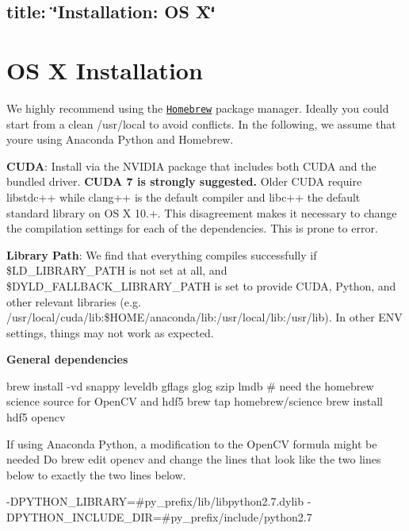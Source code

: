 

 \subsection*{title\+: \char`\"{}\+Installation\+: O\+S X\char`\"{} }

\section*{OS X Installation}

We highly recommend using the \href{http://brew.sh/}{\tt Homebrew} package manager. Ideally you could start from a clean {\ttfamily /usr/local} to avoid conflicts. In the following, we assume that you\textquotesingle{}re using Anaconda Python and Homebrew.

{\bfseries C\+U\+DA}\+: Install via the N\+V\+I\+D\+IA package that includes both C\+U\+DA and the bundled driver. {\bfseries C\+U\+DA 7 is strongly suggested.} Older C\+U\+DA require {\ttfamily libstdc++} while clang++ is the default compiler and {\ttfamily libc++} the default standard library on OS X 10.+. This disagreement makes it necessary to change the compilation settings for each of the dependencies. This is prone to error.

{\bfseries Library Path}\+: We find that everything compiles successfully if {\ttfamily \$\+L\+D\+\_\+\+L\+I\+B\+R\+A\+R\+Y\+\_\+\+P\+A\+TH} is not set at all, and {\ttfamily \$\+D\+Y\+L\+D\+\_\+\+F\+A\+L\+L\+B\+A\+C\+K\+\_\+\+L\+I\+B\+R\+A\+R\+Y\+\_\+\+P\+A\+TH} is set to provide C\+U\+DA, Python, and other relevant libraries (e.\+g. {\ttfamily /usr/local/cuda/lib\+:\$\+H\+O\+ME/anaconda/lib\+:/usr/local/lib\+:/usr/lib}). In other {\ttfamily E\+NV} settings, things may not work as expected.

{\bfseries General dependencies} \begin{DoxyVerb}brew install -vd snappy leveldb gflags glog szip lmdb
# need the homebrew science source for OpenCV and hdf5
brew tap homebrew/science
brew install hdf5 opencv
\end{DoxyVerb}


If using Anaconda Python, a modification to the Open\+CV formula might be needed Do {\ttfamily brew edit opencv} and change the lines that look like the two lines below to exactly the two lines below. \begin{DoxyVerb}  -DPYTHON_LIBRARY=#{py_prefix}/lib/libpython2.7.dylib
  -DPYTHON_INCLUDE_DIR=#{py_prefix}/include/python2.7
\end{DoxyVerb}


